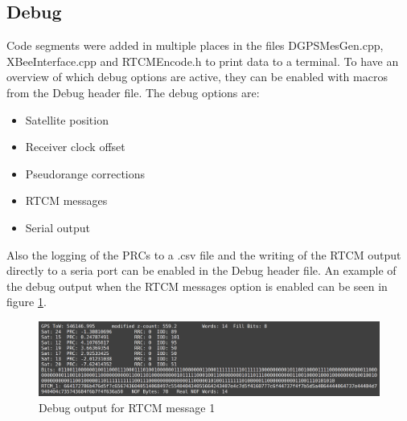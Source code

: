 \subsection{Debug}

Code segments were added in multiple places in the files DGPSMesGen.cpp, XBeeInterface.cpp and RTCMEncode.h to print data to a terminal.
To have an overview of which debug options are active, they can be enabled with macros from the Debug header file.
The debug options are:
\begin{itemize}
 \setlength\itemsep{0.1cm}
 \item Satellite position
 \item Receiver clock offset
 \item Pseudorange corrections
 \item RTCM messages
 \item Serial output
\end{itemize}
Also the logging of the PRCs to a .csv file and the writing of the RTCM output directly to a seria port can be enabled in the Debug header file.
An example of the debug output when the RTCM messages option is enabled can be seen in figure \ref{fig:rtcm_debug}.

\begin{figure}[ht]
 \centering
 \includegraphics[width=\textwidth]{images/RTCM_Debug.png}
 \caption{Debug output for RTCM message 1}
 \label{fig:rtcm_debug}
\end{figure}
